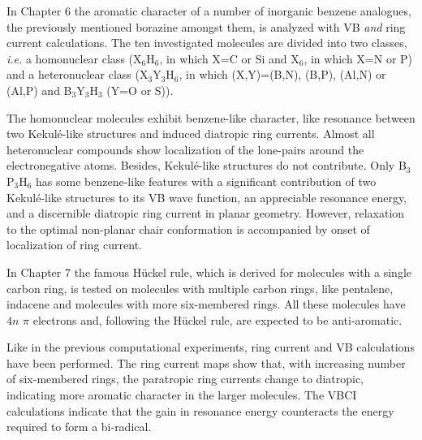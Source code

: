 In Chapter 6 the aromatic character of a number of inorganic benzene analogues, the previously mentioned borazine amongst them, is analyzed with VB \textit{and} ring current calculations. The ten investigated molecules are divided into two classes, \textit{i.e.} a homonuclear class (X$_6$H$_6$, in which X=C or Si and X$_6$, in which X=N or P) and a heteronuclear class (X$_3$Y$_3$H$_6$, in which (X,Y)=(B,N), (B,P), (Al,N) or (Al,P) and B$_3$Y$_3$H$_3$ (Y=O or S)).

The homonuclear molecules exhibit benzene-like character, like resonance between two Kekul\'e-like structures and induced diatropic ring currents. Almost all heteronuclear compounds show localization of the lone-pairs around the electronegative atoms. Besides, Kekul\'e-like structures do not contribute. Only B$_3$P$_3$H$_6$ has some benzene-like features with a significant contribution of two Kekul\'e-like structures to its VB wave function, an appreciable resonance energy, and a discernible diatropic
ring current in planar geometry. However, relaxation to the optimal non-planar chair conformation is accompanied by onset of localization of ring current.

In Chapter 7 the famous H\"uckel rule, which is derived for molecules with a single carbon ring, is tested on molecules with multiple carbon rings, like pentalene, indacene and molecules with more six-membered rings. All these molecules have $4n$ $\pi$ electrons and, following the H\"uckel rule, are expected to be anti-aromatic. 

Like in the previous computational experiments, ring current and VB calculations have been performed. The ring current maps show that, with increasing number of six-membered rings, the paratropic ring currents change to diatropic, indicating more aromatic character in the larger molecules. The VBCI calculations indicate that the gain in resonance energy counteracts the energy required to form a bi-radical.
